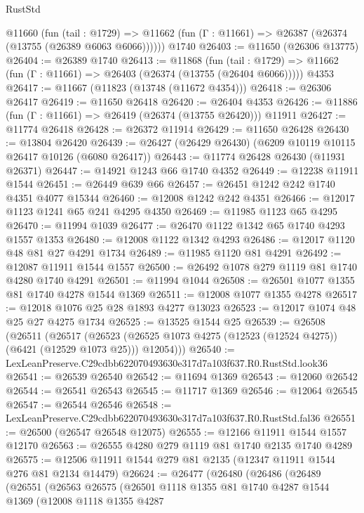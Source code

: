 \begin{lexlean}{RustStd}
\begin{coremodule}
    @11660
      (fun (tail : @1729) =>
      @11662 (fun (Γ : @11661) => @26387 (@26374 (@13755 (@26389 @6063 @6066))))))
    @1740
@26403 := @11650 (@26306 @13775)
@26404 := @26389 @1740
@26413 := @11868
    (fun (tail : @1729) => @11662 (fun (Γ : @11661) => @26403 (@26374 (@13755 (@26404 @6066)))))
    @4353
@26417 := @11667 (@11823 (@13748 (@11672 @4354)))
@26418 := @26306 @26417
@26419 := @11650 @26418
@26420 := @26404 @4353
@26426 := @11886 (fun (Γ : @11661) => @26419 (@26374 (@13755 @26420))) @11911
@26427 := @11774 @26418
@26428 := @26372 @11914
@26429 := @11650 @26428
@26430 := @13804 @26420
@26439 := @26427 (@26429 @26430) (@6209 @10119 @10115 @26417 @10126 (@6080 @26417))
@26443 := @11774 @26428 @26430 (@11931 @26371)
@26447 := @14921 @1243 @66 @1740 @4352
@26449 := @12238 @11911 @1544
@26451 := @26449 @639 @66
@26457 := @26451 @1242 @242 @1740 @4351 @4077 @15344
@26460 := @12008 @1242 @242 @4351
@26466 := @12017 @1123 @1241 @65 @241 @4295 @4350
@26469 := @11985 @1123 @65 @4295
@26470 := @11994 @1039
@26477 := @26470 @1122 @1342 @65 @1740 @4293 @1557 @1353
@26480 := @12008 @1122 @1342 @4293
@26486 := @12017 @1120 @48 @81 @27 @4291 @1734
@26489 := @11985 @1120 @81 @4291
@26492 := @12087 @11911 @1544 @1557
@26500 := @26492 @1078 @279 @1119 @81 @1740 @4280 @1740 @4291
@26501 := @11994 @1044
@26508 := @26501 @1077 @1355 @81 @1740 @4278 @1544 @1369
@26511 := @12008 @1077 @1355 @4278
@26517 := @12018 @1076 @25 @28 @1893 @4277 @13023
@26523 := @12017 @1074 @48 @25 @27 @4275 @1734
@26525 := @13525 @1544 @25
@26539 := @26508
    (@26511
      (@26517
        (@26523 (@26525 @1073 @4275 (@12523 (@12524 @4275)) (@6421 (@12529 @1073 @25))) @12054)))
@26540 := LexLeanPreserve.C29cdbb622070493630e317d7a103f637.R0.RustStd.look36
@26541 := @26539 @26540
@26542 := @11694 @1369
@26543 := @12060 @26542
@26544 := @26541 @26543
@26545 := @11717 @1369
@26546 := @12064 @26545
@26547 := @26544 @26546
@26548 := LexLeanPreserve.C29cdbb622070493630e317d7a103f637.R0.RustStd.fal36
@26551 := @26500 (@26547 @26548 @12075)
@26555 := @12166 @11911 @1544 @1557 @12170
@26563 := @26555 @4280 @279 @1119 @81 @1740 @2135 @1740 @4289
@26575 := @12506 @11911 @1544 @279 @81 @2135 (@12347 @11911 @1544 @276 @81 @2134 @14479)
@26624 := @26477
    (@26480
      (@26486
        (@26489
          (@26551
            (@26563
              @26575
              (@26501
                @1118
                @1355
                @81
                @1740
                @4287
                @1544
                @1369
                (@12008
                  @1118
                  @1355
                  @4287

\end{coremodule}
\end{lexlean}
